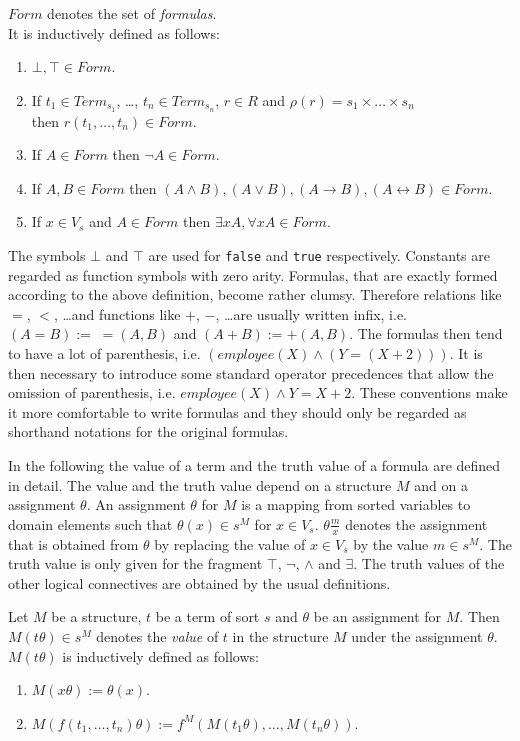 \begin{Def} $Form$ denotes the set of {\em formulas}. \\
It is inductively defined as follows:
\begin{enumerate}
\item $\bot, \top \in Form$.
\item If $t_1 \in Term_{s_1}$, \ldots, $t_n \in Term_{s_n}$, $r \in R$ and 
$\rho(r)=s_1 \times \ldots \times s_n$ \\ 
then $r(t_1, \ldots, t_n) \in Form$. 
\item If $A \in Form$ then $\neg A \in Form$. 
\item If $A, B \in Form$ then $(A \wedge B), (A \vee B), (A \rightarrow B), 
(A \leftrightarrow B) \in Form$.
\item If $x \in V_s$ and $A \in Form$ then $\exists x A, \forall x A \in Form$.
\end{enumerate} 
\end{Def}

The symbols $\bot$ and $\top$ are used for \verb.false. and \verb.true. respectively. Constants
are regarded as function symbols with zero arity. Formulas, that are exactly formed according to 
the above definition, become rather clumsy. Therefore relations like $=$, $<$, \ldots and functions 
like $+$, $-$, \ldots are usually written infix, i.e. $(A = B):=\;=\!\!(A,B)$ and $(A + B):= 
+(A,B)$. The formulas then tend to have a lot of parenthesis, i.e. $(employee(X) \wedge (Y = (X 
+ 2)))$. It is then necessary to introduce some standard operator precedences that allow the 
omission of parenthesis, i.e. $employee(X) \wedge Y = X + 2$. These conventions make it more 
comfortable to write formulas and they should only be regarded as shorthand notations for the 
original formulas.

In the following the value of a term and the truth value of a formula are defined in detail. The
value and the truth value depend on a structure $M$ and on a assignment $\theta$. An assignment 
$\theta$ for $M$ is a mapping from sorted variables to domain elements such that $\theta(x) \in 
s^M$ for $x\in V_s$. $\theta\frac{m}{x}$ denotes the assignment that is obtained from $\theta$ 
by replacing the value of $x\in V_s$ by the value $m \in s^M$. The truth value is only given for 
the fragment $\top$, $\neg$, $\wedge$ and $\exists$. The truth values of the other logical 
connectives are obtained by the usual definitions.

\begin{Def} Let $M$ be a structure, $t$ be a term of sort $s$ and $\theta$ be an assignment 
for $M$. Then $M(t\theta)\in s^M$ denotes the {\em value} of $t$ in the structure $M$ under
the assignment $\theta$. $M(t\theta)$ is inductively defined as follows:
\begin{enumerate}
\item $M(x\theta) := \theta(x)$.
\item $M(f(t_1,\ldots,t_n)\theta) := f^M(M(t_1\theta),\ldots,M(t_n\theta))$.
\end{enumerate}
\end{Def}

